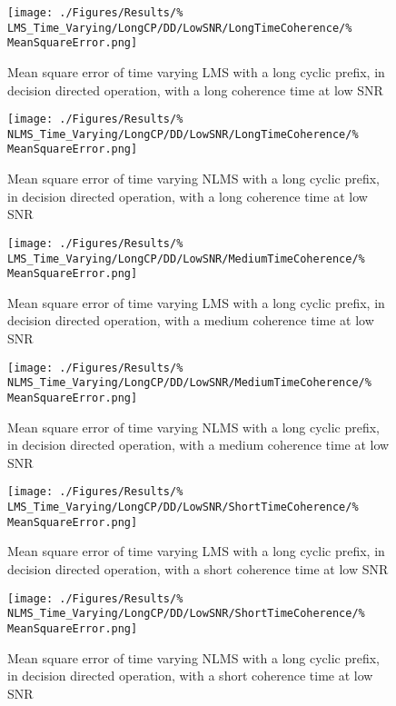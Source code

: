 \begin{figure}[ht]
	\begin{minipage}{0.49\textwidth}
		\texttt{[image: ./Figures/Results/\%
	LMS\_Time\_Varying/LongCP/DD/LowSNR/LongTimeCoherence/\%
	MeanSquareError.png]}
		\caption{Mean square error of time varying LMS with a 
		long cyclic prefix, in decision directed operation,
		with a long coherence time at low SNR}
	\end{minipage}
	\begin{minipage}{0.49\textwidth}
		\texttt{[image: ./Figures/Results/\%
	NLMS\_Time\_Varying/LongCP/DD/LowSNR/LongTimeCoherence/\%
	MeanSquareError.png]}
		\caption{Mean square error of time varying NLMS with 
		a long cyclic prefix, in decision directed operation,
		with a long coherence time at low SNR}
	\end{minipage}
\end{figure}

\begin{figure}[ht]
	\centering
	\begin{minipage}{0.49\textwidth}
		\centering
		\texttt{[image: ./Figures/Results/\%
	LMS\_Time\_Varying/LongCP/DD/LowSNR/MediumTimeCoherence/\%
	MeanSquareError.png]}
		\caption{Mean square error of time varying LMS with a 
		long cyclic prefix, in decision directed operation, 
		with a medium coherence time at low SNR}
	\end{minipage}
	\begin{minipage}{0.49\textwidth}
		\centering
		\texttt{[image: ./Figures/Results/\%
	NLMS\_Time\_Varying/LongCP/DD/LowSNR/MediumTimeCoherence/\%
	MeanSquareError.png]}
		\caption{Mean square error of time varying NLMS with 
		a long cyclic prefix, in decision directed operation,
		with a medium coherence time at low SNR}
	\end{minipage}
\end{figure}

\begin{figure}[ht]
	\begin{minipage}{0.49\textwidth}
		\centering
		\texttt{[image: ./Figures/Results/\%
	LMS\_Time\_Varying/LongCP/DD/LowSNR/ShortTimeCoherence/\%
	MeanSquareError.png]}
		\caption{Mean square error of time varying LMS with a 
		long cyclic prefix, in decision directed operation,
		with a short coherence time at low SNR}
	\end{minipage}
	\begin{minipage}{0.49\textwidth}
		\texttt{[image: ./Figures/Results/\%
	NLMS\_Time\_Varying/LongCP/DD/LowSNR/ShortTimeCoherence/\%
	MeanSquareError.png]}
		\caption{Mean square error of time varying NLMS with 
		a long cyclic prefix, in decision directed operation,
		with a short coherence time at low SNR}
	\end{minipage}
\end{figure}

